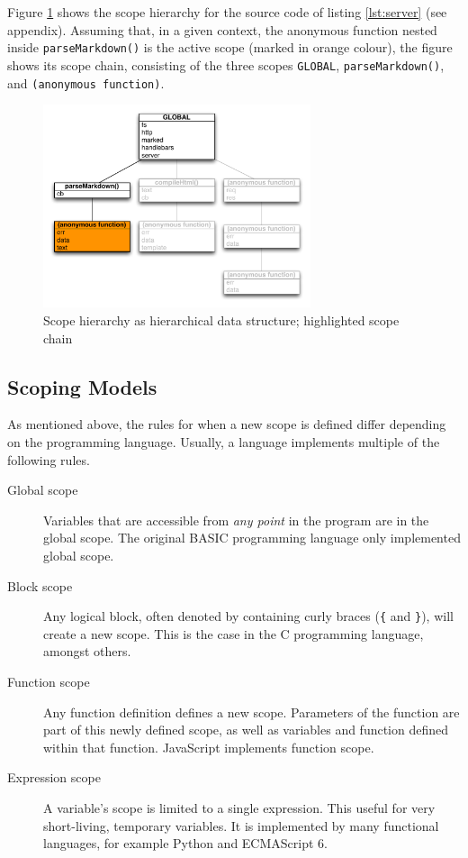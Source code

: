 Figure \ref{fig:scopechain} shows the scope hierarchy for the source
code of listing \ref{lst:server} (see appendix). Assuming that, in a
given context, the anonymous function nested inside
\texttt{parseMarkdown()} is the active scope (marked in orange colour),
the figure shows its scope chain, consisting of the three scopes
\texttt{GLOBAL}, \texttt{parseMarkdown()}, and
\texttt{(anonymous function)}.

\begin{figure}[htbp]
\centering
\includegraphics[keepaspectratio,width=0.7\textwidth]{img/scopechain.pdf}
\caption{Scope hierarchy as hierarchical data structure; highlighted scope chain}
\label{fig:scopechain}
\end{figure}

\subsection{Scoping Models}\label{scoping-models}

As mentioned above, the rules for when a new scope is defined differ
depending on the programming language. Usually, a language implements
multiple of the following rules.

\begin{description}
\item[Global scope]
Variables that are accessible from \emph{any point} in the program are
in the global scope. The original BASIC programming language only
implemented global scope.
\item[Block scope]
Any logical block, often denoted by containing curly braces (\texttt{\{}
and \texttt{\}}), will create a new scope. This is the case in the C
programming language, amongst others.
\item[Function scope]
Any function definition defines a new scope. Parameters of the function
are part of this newly defined scope, as well as variables and function
defined within that function. JavaScript implements function scope.
\item[Expression scope]
A variable’s scope is limited to a single expression. This useful for
very short-living, temporary variables. It is implemented by many
functional languages, for example Python and ECMAScript 6.
\end{description}

